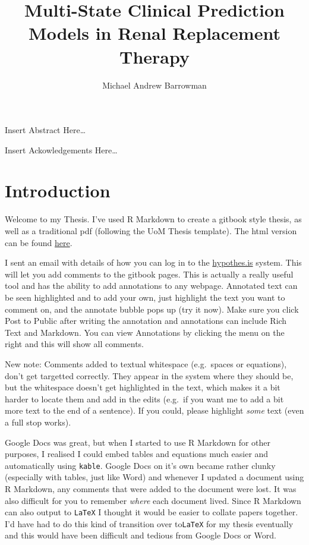 \documentclass[12pt,PhD,twoside,openright]{muthesis}
\begin{document}
\title{Multi-State Clinical Prediction Models in Renal Replacement Therapy}
\author{Michael Andrew Barrowman}
\principaladviser{}
\faculty{}
\school{}
\beforeabstract

Insert Abstract Here\ldots{}

\afterabstract


\begingroup

\setlength{\parskip}{15pt}
\setlength{\parindent}{0pt}
Insert Ackowledgements Here\ldots{}

\par
\endgroup
\afterpreface

\hypertarget{introduction}{%
\chapter*{Introduction}\label{introduction}}

Welcome to my Thesis. I've used R Markdown to create a gitbook style thesis, as well as a traditional pdf (following the UoM Thesis template). The html version can be found \href{https://michaelbarrowman.co.uk/thesis}{here}.

I sent an email with details of how you can log in to the \href{https://hypothes.is/}{hypothes.is} system. This will let you add comments to the gitbook pages. This is actually a really useful tool and has the ability to add annotations to any webpage. Annotated text can be seen highlighted and to add your own, just highlight the text you want to comment on, and the annotate bubble pops up (try it now). Make sure you click Post to Public after writing the annotation and annotations can include Rich Text and Markdown. You can view Annotations by clicking the menu on the right and this will show all comments.

New note: Comments added to textual whitespace (e.g.~spaces or equations), don't get targetted correctly. They appear in the system where they should be, but the whitespace doesn't get highlighted in the text, which makes it a bit harder to locate them and add in the edits (e.g.~if you want me to add a bit more text to the end of a sentence). If you could, please highlight \emph{some} text (even a full stop works).

Google Docs was great, but when I started to use R Markdown for other purposes, I realised I could embed tables and equations much easier and automatically using \texttt{kable}. Google Docs on it's own became rather clunky (especially with tables, just like Word) and whenever I updated a document using R Markdown, any comments that were added to the document were lost. It was also difficult for you to remember \emph{where} each document lived. Since R Markdown can also output to \texttt{LaTeX} I thought it would be easier to collate papers together. I'd have had to do this kind of transition over to\texttt{LaTeX} for my thesis eventually and this would have been difficult and tedious from Google Docs or Word.
\end{document}
